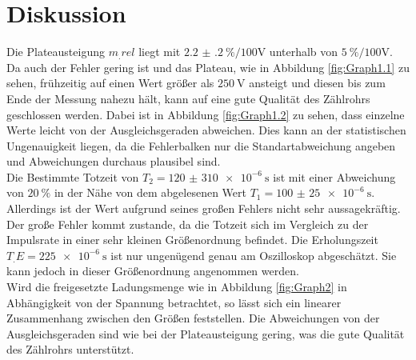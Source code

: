 
\section{Diskussion}
\label{sec:Diskussion}

Die Plateausteigung $m_.{rel}$ liegt mit $\SI{2.2(2)}{\%\per100\volt}$ unterhalb von $\SI{5}{\%\per100\volt}$. Da auch der Fehler gering ist und das Plateau, wie in Abbildung \ref{fig:Graph1.1} zu sehen, frühzeitig auf einen Wert größer als $\SI{250}{\volt}$ ansteigt und diesen bis zum Ende der Messung nahezu hält, kann auf eine gute Qualität des Zählrohrs geschlossen werden. Dabei ist in Abbildung \ref{fig:Graph1.2} zu sehen, dass einzelne Werte leicht von der Ausgleichsgeraden abweichen. Dies kann an der statistischen Ungenauigkeit liegen, da die Fehlerbalken nur die Standartabweichung angeben und Abweichungen durchaus plausibel sind.\\
Die Bestimmte Totzeit von $T_2=\SI{120(310)e-6}{\second}$  ist mit einer Abweichung von $\SI{20}{\%} $ in der Nähe von dem abgelesenen Wert $T_1=\SI{100(25)e-6}{\second}$. Allerdings ist der Wert aufgrund seines großen Fehlers nicht sehr aussagekräftig. Der große Fehler kommt zustande, da die Totzeit sich im Vergleich zu der Impulsrate in einer sehr kleinen Größenordnung befindet. Die Erholungszeit $T_.E=\SI{225e-6}{\second}$ ist nur ungenügend genau am Oszilloskop abgeschätzt. Sie kann jedoch in dieser Größenordnung angenommen werden.\\
Wird die freigesetzte Ladungsmenge wie in Abbildung \ref{fig:Graph2} in Abhängigkeit von der Spannung betrachtet, so lässt sich ein linearer Zusammenhang zwischen den Größen feststellen. Die Abweichungen von der Ausgleichsgeraden sind wie bei der Plateausteigung gering, was die gute Qualität des Zählrohrs unterstützt.  